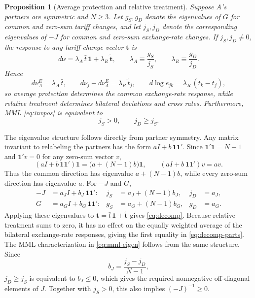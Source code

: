 \documentclass[11pt]{article}
\newtheorem{proposition}[theorem]{Proposition}
\begin{document}
\begin{proposition}[Average protection and relative treatment]
Suppose $A$'s partners are symmetric and $N\geq3$. Let $g_S,g_D$ denote the eigenvalues of $G$ for common and zero-sum tariff changes, and let $j_S,j_D$ denote the corresponding eigenvalues of $-J$ for common and zero-sum exchange-rate changes. If $j_S,j_D\neq0$, the response to any tariff-change vector $\mathbf{t}$ is
\begin{equation}
d\boldsymbol{\nu}=\lambda_A\,\bar t\,\mathbf{1}+\lambda_R\,\widetilde{\mathbf{t}}, \qquad \lambda_A\equiv\frac{g_S}{j_S}, \qquad \lambda_R\equiv\frac{g_D}{j_D}.
\label{eq:decomp}
\end{equation}
Hence
\begin{equation}
d\nu_A^E=\lambda_A\,\bar t, \qquad d\nu_j-d\nu_A^E=\lambda_R\,\tilde t_j, \qquad d\log e_{jk}=\lambda_R\,(t_k-t_j),
\label{eq:decomp-parts}
\end{equation}
so average protection determines the common exchange-rate response, while relative treatment determines bilateral deviations and cross rates. Furthermore, MML \eqref{eq:invpos} is equivalent to
\begin{equation}
j_S>0, \qquad j_D\geq j_S.
\label{eq:mml-eigen}
\end{equation}
\label{prop:decomposition}
\end{proposition}

\noindent The eigenvalue structure follows directly from partner symmetry. Any matrix invariant to relabeling the partners has the form $aI+b\,\mathbf{1}\mathbf{1}'$. Since $\mathbf{1}'\mathbf{1}=N-1$ and $\mathbf{1}'v=0$ for any zero-sum vector $v$,
\[
(aI+b\,\mathbf{1}\mathbf{1}')\mathbf{1}=\bigl(a+(N-1)b\bigr)\mathbf{1}, \qquad (aI+b\,\mathbf{1}\mathbf{1}')v=av.
\]
Thus the common direction has eigenvalue $a+(N-1)b$, while every zero-sum direction has eigenvalue $a$. For $-J$ and $G$,
\begin{equation}
\begin{aligned}
-J &= a_JI+b_J\,\mathbf{1}\mathbf{1}' : & j_S &= a_J+(N-1)b_J, & j_D &= a_J, \\
G &= a_GI+b_G\,\mathbf{1}\mathbf{1}' : & g_S &= a_G+(N-1)b_G, & g_D &= a_G.
\end{aligned}
\label{eq:jg-eigen}
\end{equation}
Applying these eigenvalues to $\mathbf{t}=\bar t\,\mathbf{1}+\widetilde{\mathbf{t}}$ gives \eqref{eq:decomp}. Because relative treatment sums to zero, it has no effect on the equally weighted average of the bilateral exchange-rate responses, giving the first equality in \eqref{eq:decomp-parts}. The MML characterization in \eqref{eq:mml-eigen} follows from the same structure. Since
\[
b_J=\frac{j_S-j_D}{N-1},
\]
$j_D\geq j_S$ is equivalent to $b_J\leq0$, which gives the required nonnegative off-diagonal elements of $J$. Together with $j_S>0$, this also implies $(-J)^{-1}\geq0$.
\end{document}
